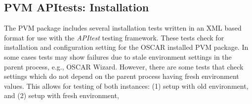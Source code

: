 %
%
%


\subsection{PVM APItests: Installation}
\label{app:pvm-apitests-install}

The PVM package includes several installation tests written in an XML
based format for use with the \emph{APItest} testing framework.  These
tests check for installation and configuration setting for the OSCAR
installed PVM package.  In some cases tests may show failures due to
stale environment settings in the parent process, e.g., OSCAR Wizard.
However, there are some tests that check settings which do not depend
on the parent process having fresh environment values.  This allows
for testing of both instances: (1) setup with old environment, and (2)
setup with fresh environment, 


%
%
%
